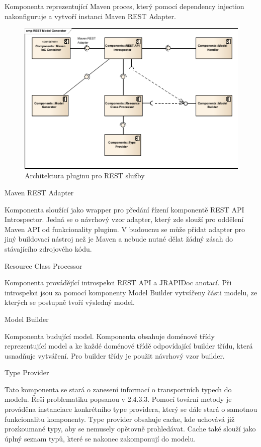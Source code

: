 \documentclass[11pt,twoside,a4paper]{book}
\begin{document}
Komponenta reprezentující Maven proces, který pomocí dependency injection nakonfiguruje
a vytvoří instanci Maven REST Adapter.

\begin{figure}[h]
\begin{center}
\includegraphics[width=13cm]{images-pdf/REST Model Generator.pdf}
\caption{Architektura pluginu pro REST služby}
\label{fig:logo}
\end{center}
\end{figure}

Maven REST Adapter

Komponenta sloužící jako wrapper pro předání řízení komponentě REST API Introspector.
Jedná se o návrhový vzor adapter, který zde slouží pro oddělení Maven API od funkcionality
pluginu. V budoucnu se může přidat adapter pro jiný buildovací nástroj než je Maven a
nebude nutné dělat žádný zásah do stávajícího zdrojového kódu.

Resource Class Processor

Komponenta provádějící introspekci REST API a JRAPIDoc anotací. Při introspekci jsou za
pomocí komponenty Model Builder vytvářeny části modelu, ze kterých se postupně tvoří
výsledný model.

Model Builder

Komponenta budující model. Komponenta obsahuje doménové třídy reprezentující model a
ke každé doménové třídě odpovídající builder třídu, která usnadňuje vytváření. Pro builder
třídy je použit návrhový vzor builder.

Type Provider

Tato komponenta se stará o zanesení informací o transportních typech do modelu. Řeší
problematiku popsanou v 2.4.3.3. Pomocí tovární metody je prováděna instanciace
konkrétního type providera, který se dále stará o samotnou funkcionalitu komponenty. Type
provider obsahuje cache, kde uchovává již prozkoumané typy, aby se nemusely opětovně
prohledávat. Cache také slouží jako úplný seznam typů, které se nakonec zakomponují do
modelu.
\end{document}

